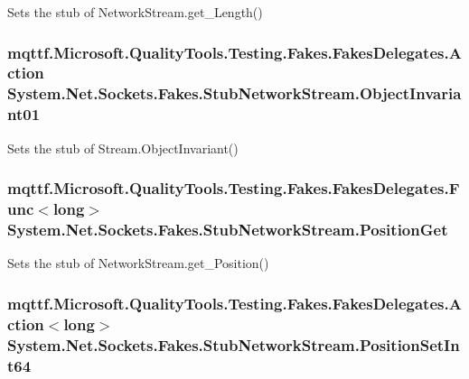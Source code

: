 Sets the stub of Network\-Stream.\-get\-\_\-\-Length()

\hypertarget{class_system_1_1_net_1_1_sockets_1_1_fakes_1_1_stub_network_stream_a1459740bc71b7c7cf1ee1908451c5c69}{
\subsubsection[{Object\-Invariant01}]{\setlength{\rightskip}{0pt plus 5cm}mqttf.\-Microsoft.\-Quality\-Tools.\-Testing.\-Fakes.\-Fakes\-Delegates.\-Action System.\-Net.\-Sockets.\-Fakes.\-Stub\-Network\-Stream.\-Object\-Invariant01}}\label{class_system_1_1_net_1_1_sockets_1_1_fakes_1_1_stub_network_stream_a1459740bc71b7c7cf1ee1908451c5c69}


Sets the stub of Stream.\-Object\-Invariant()

\hypertarget{class_system_1_1_net_1_1_sockets_1_1_fakes_1_1_stub_network_stream_aa1dbb93f0965a1b0be4ef00559885deb}{
\subsubsection[{Position\-Get}]{\setlength{\rightskip}{0pt plus 5cm}mqttf.\-Microsoft.\-Quality\-Tools.\-Testing.\-Fakes.\-Fakes\-Delegates.\-Func$<$long$>$ System.\-Net.\-Sockets.\-Fakes.\-Stub\-Network\-Stream.\-Position\-Get}}\label{class_system_1_1_net_1_1_sockets_1_1_fakes_1_1_stub_network_stream_aa1dbb93f0965a1b0be4ef00559885deb}


Sets the stub of Network\-Stream.\-get\-\_\-\-Position()

\hypertarget{class_system_1_1_net_1_1_sockets_1_1_fakes_1_1_stub_network_stream_affd54cb1dc9f1eeb9cc3bcd3954b3cbf}{
\subsubsection[{Position\-Set\-Int64}]{\setlength{\rightskip}{0pt plus 5cm}mqttf.\-Microsoft.\-Quality\-Tools.\-Testing.\-Fakes.\-Fakes\-Delegates.\-Action$<$long$>$ System.\-Net.\-Sockets.\-Fakes.\-Stub\-Network\-Stream.\-Position\-Set\-Int64}}\label{class_system_1_1_net_1_1_sockets_1_1_fakes_1_1_stub_network_stream_affd54cb1dc9f1eeb9cc3bcd3954b3cbf}



